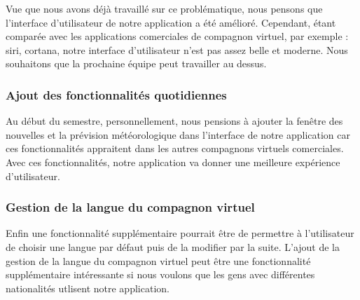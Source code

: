 \indent Vue que nous avons déjà travaillé sur ce problématique, nous pensons que l'interface d'utilisateur de notre application a été amélioré. Cependant, étant comparée avec les applications comerciales de compagnon virtuel, par exemple : siri, cortana, notre interface d'utilisateur n'est pas assez belle et moderne. Nous souhaitons que la prochaine équipe peut travailler au dessus.

\subsubsection{Ajout des fonctionnalités quotidiennes}
\indent Au début du semestre, personnellement, nous pensions à ajouter la fenêtre des nouvelles et la prévision météorologique dans l'interface de notre application car ces fonctionnalités appraitent dans les autres compagnons virtuels comerciales. Avec ces fonctionnalités, notre application va donner une meilleure expérience d'utilisateur.

\subsubsection{Gestion de la langue du compagnon virtuel}
\indent Enfin une fonctionnalité supplémentaire pourrait être de permettre à l'utilisateur de choisir une langue par défaut puis de la modifier par la suite. L'ajout de la gestion de la langue du compagnon virtuel peut être une fonctionnalité supplémentaire intéressante si nous voulons que les gens avec différentes nationalités utlisent notre application.
